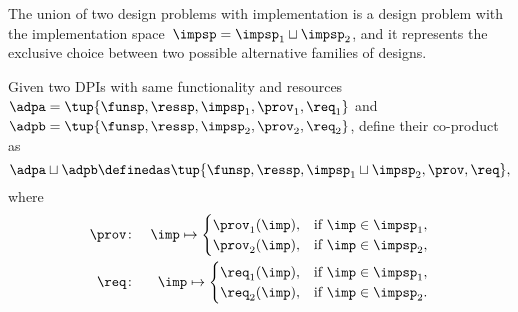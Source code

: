 
The union of two design problems with implementation is a design problem with the implementation
space~$\impsp=\impsp_{1}\sqcup\impsp_{2}$, and it represents the
exclusive choice between two possible alternative families of designs.
\begin{definition}
    \label{def:parallel-1}Given two DPIs with same functionality and
    resources~$\adpa=\tup{\funsp,\ressp,\impsp_{1},\prov_{1},\req_{1}}$
    and~$\adpb=\tup{\funsp,\ressp,\impsp_{2},\prov_{2},\req_{2}}$,
    define their co-product as
    \begin{equation}
        \adpa\sqcup\adpb\definedas\tup{\funsp,\ressp,\impsp_{1}\sqcup\impsp_{2},\prov,\req} ,
    \end{equation}
    where
    \begin{eqnarray}
        \prov & \colon & \imp\mapsto\begin{cases}
                                        \prov_{1}(\imp), & \text{if }\imp\in\impsp_{1},\\
                                        \prov_{2}(\imp), & \text{if }\imp\in\impsp_{2},
        \end{cases}\label{eq:dppar-exec-1}\\
        \req & \colon & \imp\mapsto\begin{cases}
                                       \req_{1}(\imp), & \text{if }\imp\in\impsp_{1},\\
                                       \req_{2}(\imp), & \text{if }\imp\in\impsp_{2}.
        \end{cases}\nonumber
    \end{eqnarray}
\end{definition}

%

\begin{figure}[h!]
    \centering
    \caption{}
    \label{fig:dpcoproduct}
\end{figure}


